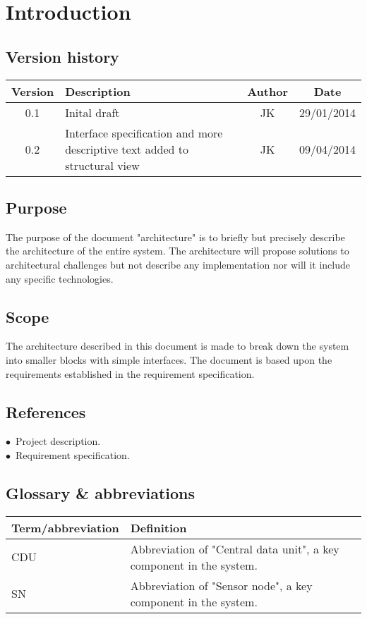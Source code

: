 \chapter{Introduction}
\section{Version history}
\begin{table}[H]
\begin{tabular}{|c|p{9cm}|c|c|}
\hline
Version & Description & Author & Date\\
\hline
0.1 & Inital draft & JK & 29/01/2014\\
\hline
0.2 & Interface specification and more descriptive text added to structural view & JK & 09/04/2014\\ \hline
\end{tabular}
\end{table}

\section{Purpose}
The purpose of the document "architecture" is to briefly but precisely describe the architecture of the entire system. The architecture will propose solutions to architectural challenges but not describe any implementation nor will it include any specific technologies.

\section{Scope}
The architecture described in this document is made to break down the system into smaller blocks with simple interfaces. The document is based upon the requirements established in the requirement specification.

\section{References}
$\bullet$\ Project description.\\
$\bullet$\ Requirement specification.\\



\section{Glossary \& abbreviations}
\begin{table}[H]
\centering
\begin{tabular}{|p{4cm}|p{7cm}|}
\hline
Term/abbreviation & Definition\\ \hline
CDU & Abbreviation of "Central data unit", a key component in the system.\\ \hline
SN & Abbreviation of "Sensor node", a key component in the system.\\ \hline
\end{tabular}
\end{table}

